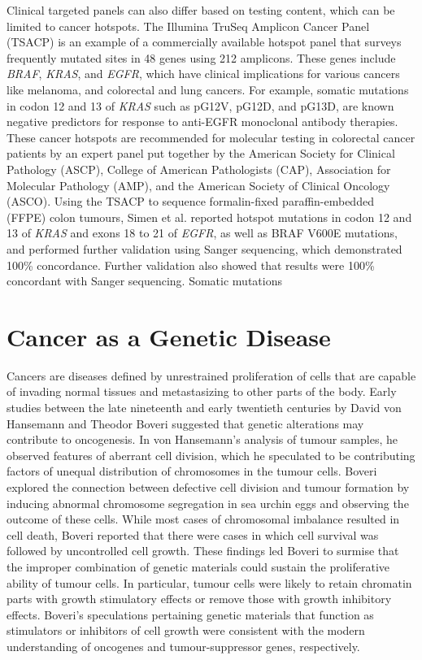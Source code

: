Clinical targeted panels can also differ based on testing content, which can be limited to cancer hotspots. The Illumina TruSeq Amplicon Cancer Panel (TSACP) is an example of a commercially available hotspot panel that surveys frequently mutated sites in 48 genes using 212 amplicons. These genes include \textit{BRAF}, \textit{KRAS}, and \textit{EGFR}, which have clinical implications for various cancers like melanoma, and colorectal and lung cancers. For example, somatic mutations in codon 12 and 13 of \textit{KRAS} such as pG12V, pG12D, and pG13D, are known negative predictors for response to anti-EGFR monoclonal antibody therapies. These cancer hotspots are recommended for molecular testing in colorectal cancer patients by an expert panel put together by the American Society for Clinical Pathology (ASCP), College of American Pathologists (CAP), Association for Molecular Pathology (AMP), and the American Society of Clinical Oncology (ASCO). Using the TSACP to sequence formalin-fixed paraffin-embedded (FFPE) colon tumours, Simen et al. \cite{} reported hotspot mutations in codon 12 and 13 of \textit{KRAS} and exons 18 to 21 of \textit{EGFR}, as well as BRAF V600E mutations, and performed further validation using Sanger sequencing, which demonstrated 100\% concordance. Further validation also showed that results were 100\% concordant with Sanger sequencing. Somatic mutations

\section{Cancer as a Genetic Disease}
\label{sec:CancerasaGeneticDisease}

Cancers are diseases defined by unrestrained proliferation of cells that are capable of invading normal tissues and metastasizing to other parts of the body. Early studies between the late nineteenth and early twentieth centuries by David von Hansemann and Theodor Boveri suggested that genetic alterations may contribute to oncogenesis. In von Hansemann's analysis of tumour samples, he observed features of aberrant cell division, which he speculated to be contributing factors of unequal distribution of chromosomes in the tumour cells. Boveri explored the connection between defective cell division and tumour formation by inducing abnormal chromosome segregation in sea urchin eggs and observing the outcome of these cells. While most cases of chromosomal imbalance resulted in cell death, Boveri reported that there were cases in which cell survival was followed by uncontrolled cell growth. These findings led Boveri to surmise that the improper combination of genetic materials could sustain the proliferative ability of tumour cells. In particular, tumour cells were likely to retain chromatin parts with growth stimulatory effects or remove those with growth inhibitory effects. Boveri's speculations pertaining genetic materials that function as stimulators or inhibitors of cell growth were consistent with the modern understanding of oncogenes and tumour-suppressor genes, respectively.

